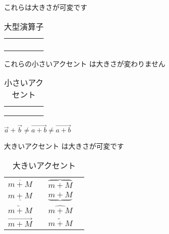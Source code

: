 %
\begin{table}[htbp]
\begin{scenter}
\caption{大型演算子}
%
%
%
{\small これらは大きさが可変です}\par
\begin{tabular}{LCCC}
    &      &    &   \\
   &    &  &  \\
 &    &    &          &   \\
    &  &    &          &  \\
\end{tabular}
\end{scenter}
\end{table}
%
\begin{table}[htbp]
\begin{scenter}%
\caption{小さいアクセント}
{\small これらの小さいアクセント%
は大きさが変わりません}\par
\begin{tabular}{LCCC}
  & & &\\
& &   &  \\
 &   &   &    & &   \\
\end{tabular}
\end{scenter}
\end{table}
%
\begin{InOut}
\( \vec{a}+\vec{b}\neq \vec{a+b} 
   \neq \overrightarrow{a+b} \)
\end{InOut}
\begin{table}[htbp]
\begin{scenter}
\caption{大きいアクセント}
{\small 大きいアクセント%
%
は大きさが可変です}\par
\begin{tabular}{LC}
$\overline{m+M}$      &      & 
  $\overbrace{m+M}$&   \rule{0pt}{1.5em}\\
$\underline{m+M}$     &     &
  $\underbrace{m+M}$&   \rule{0pt}{1.5em}\\
$\overleftarrow{m+M}$ & & 
  $\widehat{m+M}$&  \rule{0pt}{1.5em}\\
$\overrightarrow{m+M}$&& 
  $\widetilde{m+M}$&   \rule{0pt}{1.5em}\\
\end{tabular}
\end{scenter}
\end{table}
